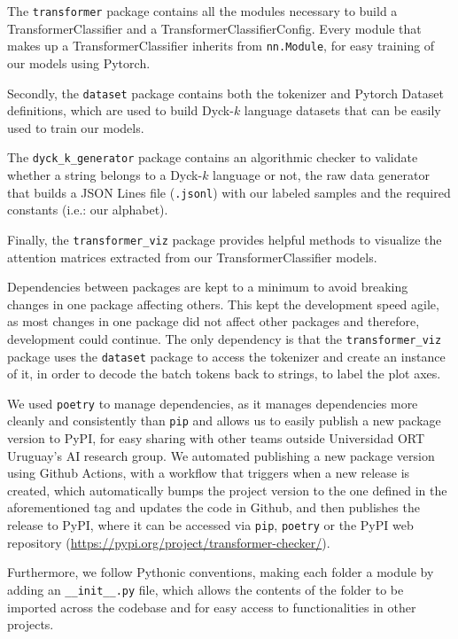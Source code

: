 The \verb|transformer| package contains all the modules necessary to build a TransformerClassifier and a TransformerClassifierConfig. Every module that makes up a TransformerClassifier inherits from \verb|nn.Module|, for easy training of our models using Pytorch.

Secondly, the \verb|dataset| package contains both the tokenizer and Pytorch Dataset definitions, which are used to build Dyck-$k$ language datasets that can be easily used to train our models. 

The \verb|dyck_k_generator| package contains an algorithmic checker to validate whether a string belongs to a Dyck-$k$ language or not, the raw data generator that builds a JSON Lines file (\verb|.jsonl|) with our labeled samples and the required constants (i.e.: our alphabet).

Finally, the \verb|transformer_viz| package provides helpful methods to visualize the attention matrices extracted from our TransformerClassifier models.

Dependencies between packages are kept to a minimum to avoid breaking changes in one package affecting others. This kept the development speed agile, as most changes in one package did not affect other packages and therefore, development could continue.
The only dependency is that the \verb|transformer_viz| package uses the \verb|dataset| package to access the tokenizer and create an instance of it, in order to decode the batch tokens back to strings, to label the plot axes.

We used \verb|poetry| \cite{poetry} to manage dependencies, as it manages dependencies more cleanly and consistently than \verb|pip| and allows us to easily publish a new package version to PyPI, for easy sharing with other teams outside Universidad ORT Uruguay's AI research group. We automated publishing a new package version using Github Actions, with a workflow that triggers when a new release is created, which automatically bumps the project version to the one defined in the aforementioned tag and updates the code in Github, and then publishes the release to PyPI, where it can be accessed via \verb|pip|, \verb|poetry| or the PyPI web repository (\url{https://pypi.org/project/transformer-checker/}).

Furthermore, we follow Pythonic conventions, making each folder a module by adding an \verb|__init__.py| file, which allows the contents of the folder to be imported across the codebase and for easy access to functionalities in other projects.

